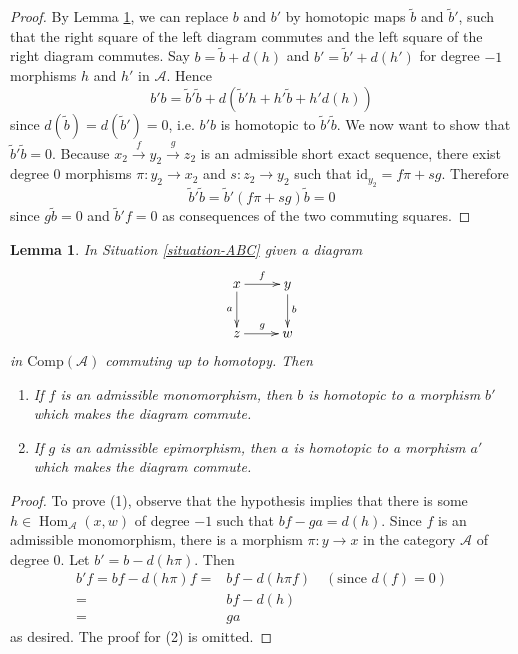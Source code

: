 \documentclass{stacks-project}
\theoremstyle{plain}
\newtheorem{lemma}[subsection]{Lemma}
\theoremstyle{definition}
\theoremstyle{remark}
\numberwithin{equation}{subsection}
\def\Hom{\mathop{\mathrm{Hom}}\nolimits}
\begin{document}
\begin{proof}
By Lemma \ref{lemma-homo-change}, we can replace $b$ and $b'$
by homotopic maps $\tilde{b}$ and $\tilde{b}'$, such that the right
square of the left diagram commutes and the left square of the right
diagram commutes. Say $b = \tilde{b} + d(h)$ and $b'=\tilde{b}'+d(h')$
for degree $-1$ morphisms $h$ and $h'$ in $\mathcal{A}$. Hence
$$
b'b = \tilde{b}'\tilde{b} + d(\tilde{b}'h + h'\tilde{b} + h'd(h))
$$
since $d(\tilde{b})=d(\tilde{b}')=0$, i.e. $b'b$ is homotopic to
$\tilde{b}'\tilde{b}$. We now want to show that $\tilde{b}'\tilde{b}=0$.
Because $x_2\xrightarrow{f} y_2\xrightarrow{g} z_2$ is an admissible
short exact sequence, there exist degree $0$ morphisms
$\pi : y_2 \to x_2$ and $s : z_2 \to y_2$ such that
$\text{id}_{y_2} = f\pi + sg$. Therefore
$$
\tilde{b}'\tilde{b} = \tilde{b}'(f\pi + sg)\tilde{b} = 0
$$
since $g\tilde{b} = 0$ and $\tilde{b}'f = 0$ as consequences
of the two commuting squares.
\end{proof}

\begin{lemma}
\label{lemma-homo-change}
In Situation \ref{situation-ABC} given a diagram
$$
\xymatrix{x\ar[r]^f\ar[d]_a & y\ar[d]^b\\
z\ar[r]^g & w}
$$
in $\text{Comp}(\mathcal{A})$ commuting up to homotopy. Then
\begin{enumerate}
\item If $f$ is an admissible monomorphism, then $b$ is homotopic
to a morphism $b'$ which makes the diagram commute.
\item If $g$ is an admissible epimorphism, then $a$ is homotopic
to a morphism $a'$ which makes the diagram commute.
\end{enumerate}
\end{lemma}

\begin{proof}
To prove (1), observe that the hypothesis implies that there is some
$h\in\Hom_{\mathcal{A}}(x,w)$ of degree $-1$ such that $bf-ga=d(h)$.
Since $f$ is an admissible monomorphism, there is a morphism
$\pi : y \to x$ in the category $\mathcal{A}$ of degree $0$.
Let $b' = b - d(h\pi)$. Then
\begin{align*}
b'f = bf - d(h\pi)f
= &
bf - d(h\pi f) \quad (\text{since }d(f) = 0) \\
= &
bf-d(h) \\
= &
ga
\end{align*}
as desired. The proof for (2) is omitted.
\end{proof}
\end{document}
